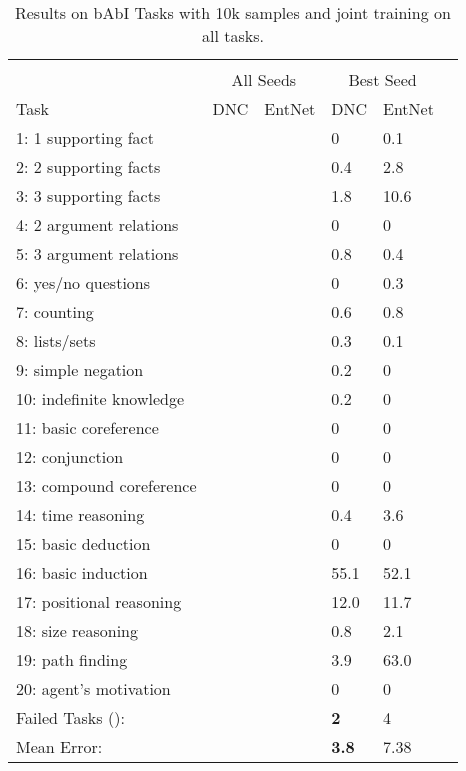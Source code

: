 \documentclass{article} \usepackage{iclr2016_conference,times}
\newcommand{\modelabbrev}{EntNet}
\begin{document}
\begin{table}[t]
\caption{Results on bAbI Tasks with 10k samples and joint training on all tasks.}
\label{joint}
\begin{center}
\begin{tabular}{lll|lll}
\hline \\
\multicolumn{1}{c}{} & \multicolumn{2}{c}{All Seeds} & \multicolumn{2}{c}{Best Seed} \\
\hline 
Task & DNC & \modelabbrev & DNC &  \modelabbrev \\
\hline 
1: 1 supporting fact &  &  & 0 & 0.1       \\
2: 2 supporting facts &  &  & 0.4 & 2.8       \\
3: 3 supporting facts &  &  & 1.8 & 10.6        \\
4: 2 argument relations &  &  & 0 & 0      \\
5: 3 argument relations &  &  & 0.8 & 0.4     \\
6: yes/no questions &  &  & 0 & 0.3         \\
7: counting &  &  & 0.6 & 0.8 \\
8: lists/sets &  &  & 0.3 & 0.1 \\
9: simple negation &  &  & 0.2 & 0 \\
10: indefinite knowledge &  &  & 0.2 & 0 \\
11: basic coreference &  &  & 0 & 0\\
12: conjunction &  &  & 0 & 0\\
13: compound coreference &  &  & 0 & 0 \\
14: time reasoning &  &  & 0.4 & 3.6 \\
15: basic deduction &  &  & 0 & 0 \\
16: basic induction &  &  & 55.1 & 52.1 \\
17: positional reasoning &  &  & 12.0 & 11.7 \\
18: size reasoning &  &  & 0.8 & 2.1 \\
19: path finding  &  &  & 3.9 & 63.0 \\
20: agent's motivation &  &  & 0 & 0\\
\hline
Failed Tasks (): &   &  & \textbf{2} & 4 \\
Mean Error: &  &  & \textbf{3.8} & 7.38 \\
\end{tabular}
\end{center}
\end{table}
\end{document}
